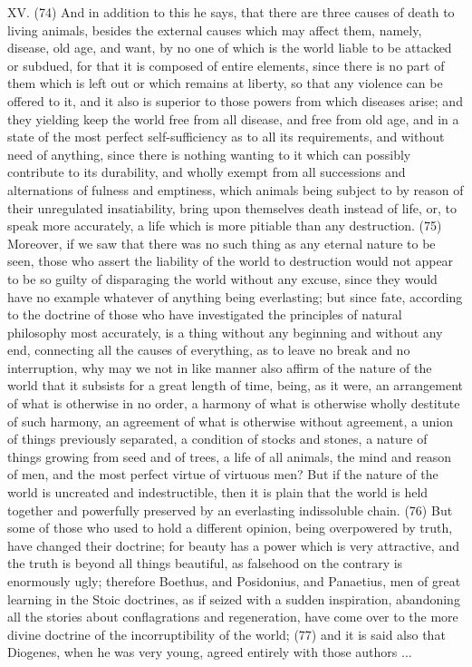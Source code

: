 XV. (74) And in addition to this he says, that there are three causes of death to living animals,
besides the external causes which may affect them, namely, disease, old age, and want, by no one
of which is the world liable to be attacked or subdued, for that it is composed of entire elements,
since there is no part of them which is left out or which remains at liberty, so that any violence can
be offered to it, and it also is superior to those powers from which diseases arise; and they yielding
keep the world free from all disease, and free from old age, and in a state of the most perfect
self-sufficiency as to all its requirements, and without need of anything, since there is nothing
wanting to it which can possibly contribute to its durability, and wholly exempt from all successions
and alternations of fulness and emptiness, which animals being subject to by reason of their
unregulated insatiability, bring upon themselves death instead of life, or, to speak more accurately,
a life which is more pitiable than any destruction. (75) Moreover, if we saw that there was no such
thing as any eternal nature to be seen, those who assert the liability of the world to destruction
would not appear to be so guilty of disparaging the world without any excuse, since they would have
no example whatever of anything being everlasting; but since fate, according to the doctrine of
those who have investigated the principles of natural philosophy most accurately, is a thing without
any beginning and without any end, connecting all the causes of everything, as to leave no break
and no interruption, why may we not in like manner also affirm of the nature of the world that it
subsists for a great length of time, being, as it were, an arrangement of what is otherwise in no
order, a harmony of what is otherwise wholly destitute of such harmony, an agreement of what is
otherwise without agreement, a union of things previously separated, a condition of stocks and
stones, a nature of things growing from seed and of trees, a life of all animals, the mind and reason
of men, and the most perfect virtue of virtuous men? But if the nature of the world is uncreated and
indestructible, then it is plain that the world is held together and powerfully preserved by an
everlasting indissoluble chain. (76) But some of those who used to hold a different opinion, being
overpowered by truth, have changed their doctrine; for beauty has a power which is very attractive,
and the truth is beyond all things beautiful, as falsehood on the contrary is enormously ugly;
therefore Boethus, and Posidonius, and Panaetius, men of great learning in the Stoic doctrines, as
if seized with a sudden inspiration, abandoning all the stories about conflagrations and
regeneration, have come over to the more divine doctrine of the incorruptibility of the world; (77)
and it is said also that Diogenes, when he was very young, agreed entirely with those authors ...

